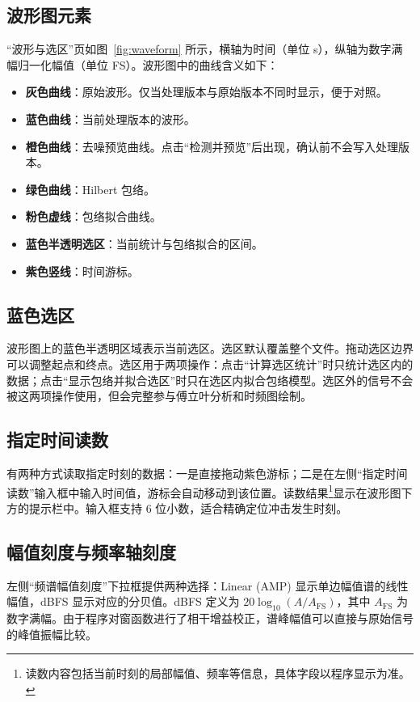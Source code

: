 \documentclass[UTF8,a4paper,12pt,scheme=chinese]{ctexart}
\begin{document}
\subsection{波形图元素}

“波形与选区”页如图~\ref{fig:waveform} 所示，横轴为时间（单位 s），纵轴为数字满幅归一化幅值（单位 FS）。波形图中的曲线含义如下：

\begin{itemize}
  \item \textbf{灰色曲线}：原始波形。仅当处理版本与原始版本不同时显示，便于对照。
  \item \textbf{蓝色曲线}：当前处理版本的波形。
  \item \textbf{橙色曲线}：去噪预览曲线。点击“检测并预览”后出现，确认前不会写入处理版本。
  \item \textbf{绿色曲线}：Hilbert 包络。
  \item \textbf{粉色虚线}：包络拟合曲线。
  \item \textbf{蓝色半透明选区}：当前统计与包络拟合的区间。
  \item \textbf{紫色竖线}：时间游标。
\end{itemize}

\subsection{蓝色选区}

波形图上的蓝色半透明区域表示当前选区。选区默认覆盖整个文件。拖动选区边界可以调整起点和终点。选区用于两项操作：点击“计算选区统计”时只统计选区内的数据；点击“显示包络并拟合选区”时只在选区内拟合包络模型。选区外的信号不会被这两项操作使用，但会完整参与傅立叶分析和时频图绘制。

\subsection{指定时间读数}

有两种方式读取指定时刻的数据：一是直接拖动紫色游标；二是在左侧“指定时间读数”输入框中输入时间值，游标会自动移动到该位置。读数结果\footnote{读数内容包括当前时刻的局部幅值、频率等信息，具体字段以程序显示为准。}显示在波形图下方的提示栏中。输入框支持 6 位小数，适合精确定位冲击发生时刻。

\subsection{幅值刻度与频率轴刻度}

左侧“频谱幅值刻度”下拉框提供两种选择：Linear (AMP) 显示单边幅值谱的线性幅值，dBFS 显示对应的分贝值。dBFS 定义为 $20\log_{10}(A/A_{\text{FS}})$，其中 $A_{\text{FS}}$ 为数字满幅。由于程序对窗函数进行了相干增益校正，谱峰幅值可以直接与原始信号的峰值振幅比较。
\end{document}
